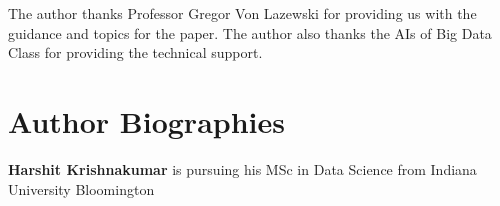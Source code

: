\documentclass[9pt,twocolumn,twoside]{styles/osajnl}
\begin{document}
The author thanks Professor Gregor Von Lazewski for providing us with the guidance and topics for the paper. The author also thanks the AIs of Big Data Class for providing the technical
support.




 
\section*{Author Biographies}
\begingroup
\setlength\intextsep{0pt}
\begin{minipage}[t][3.2cm][t]{1.0\columnwidth} %
{\bfseries Harshit Krishnakumar} is pursuing his MSc in Data Science from
Indiana University Bloomington
\end{minipage}
\endgroup
\end{document}

